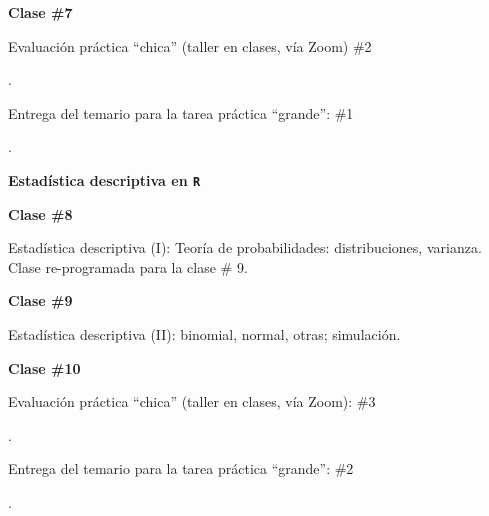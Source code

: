 \documentclass[letterpaper]{article}
\renewenvironment{itemize}{
  \begin{list}{}{
    \setlength{\leftmargin}{1.5em}
  }
}{
  \end{list}
}
\begin{document}
\begin{enumerate}
			\begin{itemize} 
				\item[$\bullet$] {\bf Clase \#7}
					\begin{itemize} 
				{\color{red}\item[\Pointinghand] Evaluaci\'on pr\'actica ``chica'' (taller en clases, v\'ia Zoom) \#2}.
				{\color{orange}\item[$\bigstar$] Entrega del temario para la tarea pr\'actica ``grande'': \#1}.
					\end{itemize}
			\end{itemize}






	\item {\bf Estad\'istica descriptiva en \texttt{R}}

			\begin{itemize} 
				\item[$\bullet$] {\bf Clase \#8}
					\begin{itemize} 
				\item[$\circ$] Estad\'istica descriptiva (I): Teor\'ia de probabilidades: distribuciones, varianza. Clase re-programada para la clase \# 9. %
					\end{itemize}
			\end{itemize}


			\begin{itemize} 
				\item[$\bullet$] {\bf Clase \#9}
					\begin{itemize} 
				\item[$\circ$] Estad\'istica descriptiva (II): binomial, normal, otras; simulaci\'on. %
					\end{itemize}
			\end{itemize}


			\begin{itemize} 
				\item[$\bullet$] {\bf Clase \#10}
					\begin{itemize} 
				{\color{red}\item[\Pointinghand] Evaluaci\'on pr\'actica ``chica'' (taller en clases, v\'ia Zoom): \#3}.
				{\color{orange}\item[$\bigstar$] Entrega del temario para la tarea pr\'actica ``grande'': \#2}.

					\end{itemize}
			\end{itemize}




\end{enumerate}
\end{document}
